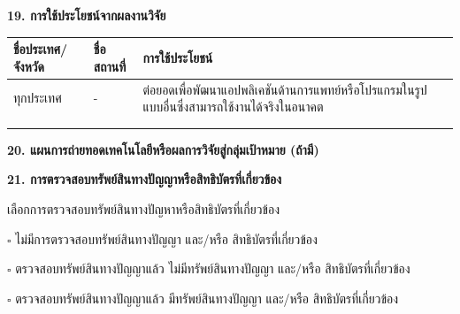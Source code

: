 \documentclass[16pt]{extarticle}
\newcounter{none} %
\begin{document}
\textbf{19. การใช้ประโยชน์จากผลงานวิจัย}

{\def\LTcaptype{none} %
\begin{longtable}[]{@{}
  >{\raggedright\arraybackslash}p{}
  >{\raggedright\arraybackslash}p{}
  >{\raggedright\arraybackslash}p{}@{}}
\toprule\noalign{}
\begin{minipage}[b]{\linewidth}\centering
\textbf{ชื่อประเทศ/จังหวัด}
\end{minipage} & \begin{minipage}[b]{\linewidth}\centering
\textbf{ชื่อสถานที่}
\end{minipage} & \begin{minipage}[b]{\linewidth}\centering
\textbf{การใช้ประโยชน์}
\end{minipage} \\
\midrule\noalign{}
\endhead
\bottomrule\noalign{}
\endlastfoot
ทุกประเทศ & - &
ต่อยอดเพื่อพัฒนาแอปพลิเคชันด้านการแพทย์หรือโปรแกรมในรูปแบบอื่นซึ่งสามารถใช้งานได้จริงในอนาคต \\
& & \\
& & \\
\end{longtable}
}

\textbf{20. แผนการถ่ายทอดเทคโนโลยีหรือผลการวิจัยสู่กลุ่มเป้าหมาย (ถ้ามี)}

\textbf{21. การตรวจสอบทรัพย์สินทางปัญญาหรือสิทธิบัตรที่เกี่ยวข้อง}

เลือกการตรวจสอบทรัพย์สินทางปัญหาหรือสิทธิบัตรที่เกี่ยวข้อง

$\square$ ไม่มีการตรวจสอบทรัพย์สินทางปัญญา และ/หรือ สิทธิบัตรที่เกี่ยวข้อง

$\square$ ตรวจสอบทรัพย์สินทางปัญญาแล้ว ไม่มีทรัพย์สินทางปัญญา และ/หรือ สิทธิบัตรที่เกี่ยวข้อง

$\square$ ตรวจสอบทรัพย์สินทางปัญญาแล้ว มีทรัพย์สินทางปัญญา และ/หรือ สิทธิบัตรที่เกี่ยวข้อง
\end{document}
